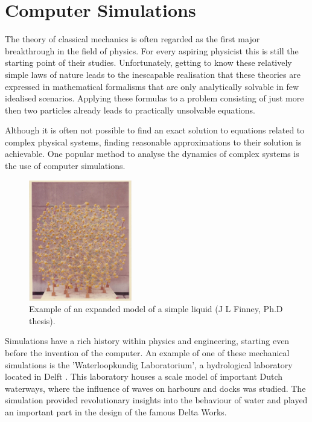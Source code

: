 \section{Computer Simulations}

The theory of classical mechanics is often regarded as the first major breakthrough in
the field of physics. For every aspiring physicist this is still the starting point of
their studies. Unfortunately, getting to know these relatively simple laws of nature
leads to the inescapable realisation that these theories are expressed in mathematical
formalisms that are only analytically solvable in few idealised scenarios. Applying these
formulas to a problem consisting of just more then two particles already leads to
practically unsolvable equations.

Although it is often not possible to find an exact solution to equations
related to complex physical systems, finding reasonable approximations to their solution
is achievable. One popular method to analyse the dynamics of complex systems is the use
of computer simulations.

\begin{figure}
    \vspace{-0.5cm}
  \begin{center}
    \includegraphics[width=0.4\textwidth]{Figures/WaterModel.png}
  \end{center}
  \caption[Example of an expanded model of a simple liquid.]{Example of an expanded model
  of a simple liquid (J L Finney, Ph.D thesis).
  \cite{Finney_2007}}
\end{figure}

Simulations have a rich history within physics and engineering, starting even before the
invention of the computer. An example of one of these mechanical simulations is the
'Waterloopkundig Laboratorium', a hydrological laboratory located in Delft
\cite{Vreugdenhil2001}.  This
laboratory houses a scale model of important Dutch waterways, where the influence of
waves on harbours and docks was studied.  The simulation provided revolutionary insights
into the behaviour of water and played an important part in the design of the famous
Delta Works.

